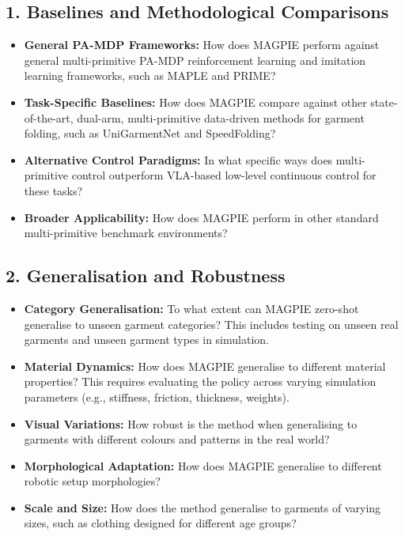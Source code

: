 \documentclass[journal]{IEEEtran}
\begin{document}
\subsection*{1. Baselines and Methodological Comparisons}
\begin{itemize}
    \item \textbf{General PA-MDP Frameworks:} How does MAGPIE perform against general multi-primitive PA-MDP reinforcement learning and imitation learning frameworks, such as MAPLE and PRIME?
    \item \textbf{Task-Specific Baselines:} How does MAGPIE compare against other state-of-the-art, dual-arm, multi-primitive data-driven methods for garment folding, such as UniGarmentNet and SpeedFolding?
    \item \textbf{Alternative Control Paradigms:} In what specific ways does multi-primitive control outperform VLA-based low-level continuous control for these tasks?
    \item \textbf{Broader Applicability:} How does MAGPIE perform in other standard multi-primitive benchmark environments?
\end{itemize}

\subsection*{2. Generalisation and Robustness}
\begin{itemize}
    \item \textbf{Category Generalisation:} To what extent can MAGPIE zero-shot generalise to unseen garment categories? This includes testing on unseen real garments and unseen garment types in simulation.
    \item \textbf{Material Dynamics:} How does MAGPIE generalise to different material properties? This requires evaluating the policy across varying simulation parameters (e.g., stiffness, friction, thickness, weights).
    \item \textbf{Visual Variations:} How robust is the method when generalising to garments with different colours and patterns in the real world?
    \item \textbf{Morphological Adaptation:} How does MAGPIE generalise to different robotic setup morphologies?
    \item \textbf{Scale and Size:} How does the method generalise to garments of varying sizes, such as clothing designed for different age groups?
\end{itemize}
\end{document}
